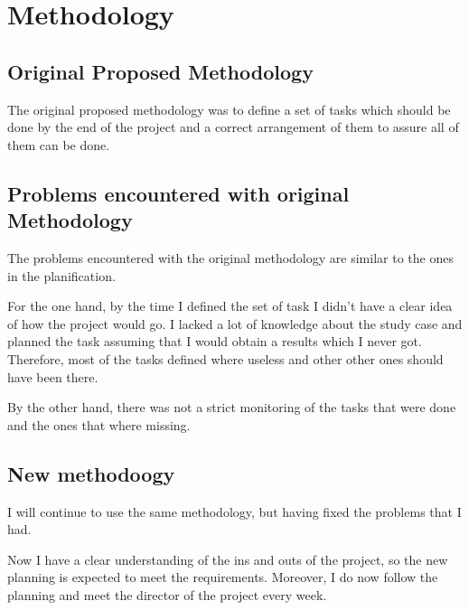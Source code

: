 \documentclass{article}
\begin{document}
\section{Methodology}
    \subsection{Original Proposed Methodology}
    The original proposed methodology was to define a set of tasks which should
    be done by the end of the project and a correct arrangement of them to
    assure all of them can be done.
    \subsection{Problems encountered with original Methodology}
    The problems encountered with the original methodology are similar to the
    ones in the planification.

    For the one hand, by the time I defined the set of task I didn't have a
    clear idea of how the project would go. I lacked a lot of knowledge about
    the study case and planned the task assuming that I would obtain a results
    which I never got. Therefore, most of the tasks defined where useless and
    other other ones should have been there.

    By the other hand, there was not a strict monitoring of the tasks that were
    done  and the ones that where missing.
    \subsection{New methodoogy}

    I will continue to use the same methodology, but having fixed the problems
    that I had.

    Now I have a clear understanding of the ins and outs of the project, so the
    new planning is expected to meet the requirements. Moreover, I do
    now follow the planning and meet the director of the project every week.


%
%
%
%
\end{document}
